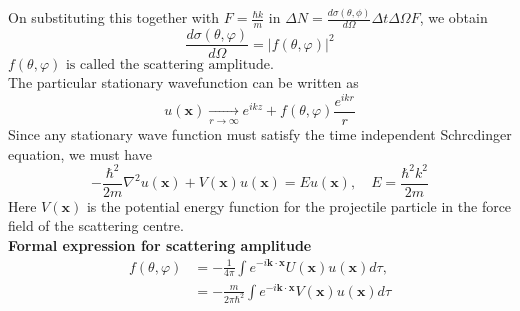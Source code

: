 On substituting this together with $F=\frac{\hbar k}{m}$ in $ \Delta N=\frac{d\sigma(\theta,\phi)}{d\Omega}\Delta t \Delta \Omega F$, we obtain\\
$$\frac{d \sigma(\theta, \varphi)}{d \Omega}=|f(\theta, \varphi)|^{2}$$
\textbf{$f(\theta, \varphi) \text { is called the scattering amplitude. }$}\\
The particular stationary  wavefunction can be written as \\
$$u(\mathbf{x}) \underset{r \rightarrow \infty}{\longrightarrow} e^{i k z}+f(\theta, \varphi) \frac{e^{i k r}}{r}$$
Since any stationary wave function must satisfy the time independent Schrcdinger equation, we must have
$$
-\frac{\hbar^{2}}{2 m} \nabla^{2} u(\mathbf{x})+V(\mathbf{x}) u(\mathbf{x})=E u(\mathbf{x}), \quad E=\frac{\hbar^{2} k^{2}}{2 m}
$$
Here $V(\mathbf{x})$ is the potential energy function for the projectile particle in the force field of the scattering centre. \\
\textbf{Formal expression for scattering amplitude}
$$\begin{aligned}
	f(\theta, \varphi) &=-\frac{1}{4 \pi} \int e^{-i \mathbf{k} \cdot \mathbf{x}} U(\mathbf{x}) u(\mathbf{x}) d \tau, \\
	&=-\frac{m}{2 \pi \hbar^{2}} \int e^{-i \mathbf{k} \cdot \mathbf{x}} V(\mathbf{x}) u(\mathbf{x}) d \tau
\end{aligned}$$
